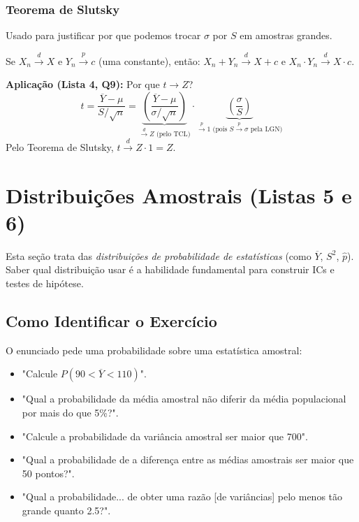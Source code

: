 \subsubsection{Teorema de Slutsky}
Usado para justificar por que podemos trocar $\sigma$ por $S$ em amostras grandes.
\begin{teorema}[Slutsky]
Se $X_n \xrightarrow{d} X$ e $Y_n \xrightarrow{p} c$ (uma constante), então:
$X_n + Y_n \xrightarrow{d} X + c$ e $X_n \cdot Y_n \xrightarrow{d} X \cdot c$.
\end{teorema}
\textbf{Aplicação (Lista 4, Q9):} Por que $t \rightarrow Z$?
$$ t = \frac{\overline{Y} - \mu}{S / \sqrt{n}} = \underbrace{\left(\frac{\overline{Y} - \mu}{\sigma / \sqrt{n}}\right)}_{\xrightarrow{d} Z \text{ (pelo TCL)}} \cdot \underbrace{\left(\frac{\sigma}{S}\right)}_{\xrightarrow{p} 1 \text{ (pois } S \xrightarrow{p} \sigma \text{ pela LGN)}} $$
Pelo Teorema de Slutsky, $t \xrightarrow{d} Z \cdot 1 = Z$.

\section{Distribuições Amostrais (Listas 5 e 6)}
\label{sec:amostrais}
Esta seção trata das \textit{distribuições de probabilidade de estatísticas} (como $\overline{Y}$, $S^2$, $\hat{p}$). Saber qual distribuição usar é a habilidade fundamental para construir ICs e testes de hipótese.

\subsection{Como Identificar o Exercício}
O enunciado pede uma probabilidade sobre uma estatística amostral:
\begin{itemize}
    \item "Calcule $P(90 < \overline{Y} < 110)$".
    \item "Qual a probabilidade da média amostral não diferir da média populacional por mais do que 5\%?".
    \item "Calcule a probabilidade da variância amostral ser maior que 700".
    \item "Qual a probabilidade de a diferença entre as médias amostrais ser maior que 50 pontos?".
    \item "Qual a probabilidade... de obter uma razão [de variâncias] pelo menos tão grande quanto 2.5?".
\end{itemize}

